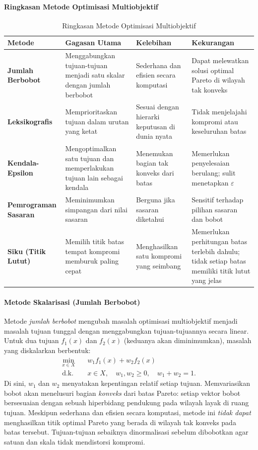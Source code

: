 \paragraph{Ringkasan Metode Optimisasi Multiobjektif}

\begin{table}[h]
\centering
\caption{Ringkasan Metode Optimisasi Multiobjektif}
\label{tab:moo-methods}
\renewcommand{\arraystretch}{1.3}
\begin{tabular}{|l|p{4.2cm}|p{3.5cm}|p{3.5cm}|}
\hline
\textbf{Metode} & \textbf{Gagasan Utama} & \textbf{Kelebihan} & \textbf{Kekurangan} \\
\hline
\textbf{Jumlah Berbobot} & Menggabungkan tujuan-tujuan menjadi satu skalar dengan jumlah berbobot & Sederhana dan efisien secara komputasi & Dapat melewatkan solusi optimal Pareto di wilayah tak konveks \\
\hline
\textbf{Leksikografis} & Memprioritaskan tujuan dalam urutan yang ketat & Sesuai dengan hierarki keputusan di dunia nyata & Tidak menjelajahi kompromi atau keseluruhan batas \\
\hline
\textbf{Kendala-Epsilon} & Mengoptimalkan satu tujuan dan memperlakukan tujuan lain sebagai kendala & Menemukan bagian tak konveks dari batas & Memerlukan penyelesaian berulang; sulit menetapkan $\varepsilon$ \\
\hline
\textbf{Pemrograman Sasaran} & Meminimumkan simpangan dari nilai sasaran & Berguna jika sasaran diketahui & Sensitif terhadap pilihan sasaran dan bobot \\
\hline
\textbf{Siku (Titik Lutut)} & Memilih titik batas tempat kompromi memburuk paling cepat & Menghasilkan satu kompromi yang seimbang & Memerlukan perhitungan batas terlebih dahulu; tidak setiap batas memiliki titik lutut yang jelas \\
\hline
\end{tabular}
\end{table}

\paragraph{Metode Skalarisasi (Jumlah Berbobot)}
Metode \emph{jumlah berbobot} mengubah masalah optimisasi multiobjektif menjadi masalah tujuan tunggal dengan menggabungkan tujuan-tujuannya secara linear.
Untuk dua tujuan $f_1(x)$ dan $f_2(x)$ (keduanya akan diminimumkan), masalah yang diskalarkan berbentuk:
\begin{align*}
\min_{x \in X} \quad & w_1 f_1(x) + w_2 f_2(x) \\
\text{d.k.} \quad & x \in X, \quad w_1, w_2 \ge 0, \quad w_1 + w_2 = 1.
\end{align*}
Di sini, $w_1$ dan $w_2$ menyatakan kepentingan relatif setiap tujuan. Memvariasikan bobot akan menelusuri bagian \emph{konveks} dari batas Pareto: setiap vektor bobot bersesuaian dengan sebuah hiperbidang pendukung pada wilayah layak di ruang tujuan.
Meskipun sederhana dan efisien secara komputasi, metode ini \emph{tidak dapat} menghasilkan titik optimal Pareto yang berada di wilayah tak konveks pada batas tersebut. Tujuan-tujuan sebaiknya dinormalisasi sebelum dibobotkan agar satuan dan skala tidak mendistorsi kompromi.

